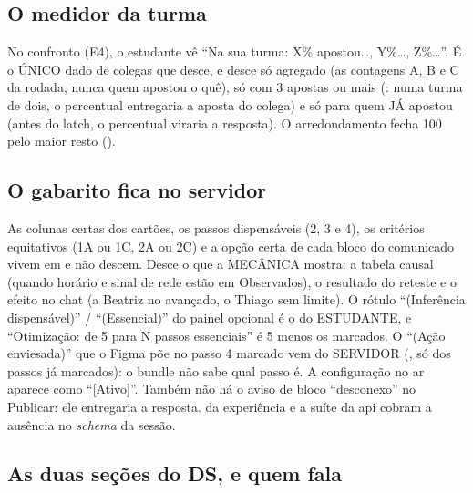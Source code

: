 \subsection{O medidor da turma}

No confronto (E4), o estudante vê \enquote{Na sua turma: X\% apostou\ldots,
Y\%\ldots, Z\%\ldots}. É o ÚNICO dado de colegas que desce, e desce só
agregado (as contagens A, B e C da rodada, nunca quem apostou o quê), só
com 3 apostas ou mais (: numa turma de dois, o
percentual entregaria a aposta do colega) e só para quem JÁ apostou (antes do
latch, o percentual viraria a resposta). O arredondamento fecha 100 pelo
maior resto ().

\subsection{O gabarito fica no servidor}

As colunas certas dos cartões, os passos dispensáveis (2, 3 e 4), os
critérios equitativos (1A ou 1C, 2A ou 2C) e a opção certa de cada bloco do
comunicado vivem em  e não descem. Desce o que a MECÂNICA
mostra: a tabela causal (quando horário e sinal de rede estão em
Observados), o resultado do reteste e o efeito no chat (a Beatriz no
avançado, o Thiago sem limite). O rótulo \enquote{(Inferência dispensável)} /
\enquote{(Essencial)} do painel opcional é o do ESTUDANTE, e
\enquote{Otimização: de 5 para N passos essenciais} é 5 menos os marcados. O
\enquote{(Ação enviesada)} que o Figma põe no passo 4 marcado vem do SERVIDOR
(, só dos passos já marcados): o bundle não
sabe qual passo é. A configuração no ar aparece como \enquote{[Ativo]}. Também não
há o aviso de bloco \enquote{desconexo} no Publicar: ele entregaria a
resposta.  da experiência e a suíte da api cobram a
ausência no \emph{schema} da sessão.

\subsection{As duas seções do DS, e quem fala}


